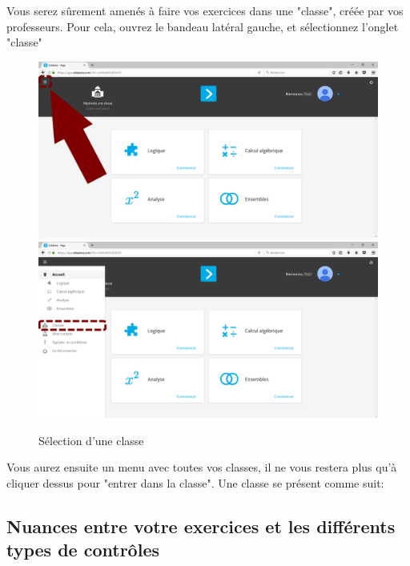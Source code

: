 \documentclass[a4paper]{article}
\begin{document}
Vous serez sûrement amenés à faire vos exercices dans une "classe", créée par vos professeurs. Pour cela, ouvrez le bandeau latéral gauche, et sélectionnez l'onglet "classe"
\begin{figure}[h!]
\begin{center}
\includegraphics[scale=0.1]{img_app8.png}
\includegraphics[scale=0.1]{img_app8bis.png}
\end{center}
\caption{Sélection d'une classe}\label{im:selec_classe}
\end{figure}
\FloatBarrier

Vous aurez ensuite un menu avec toutes vos classes, il ne vous restera plus qu'à cliquer dessus pour "entrer dans la classe".
Une classe se présent comme suit:



\subsection{Nuances entre votre exercices et les différents types de contrôles}
\end{document}

